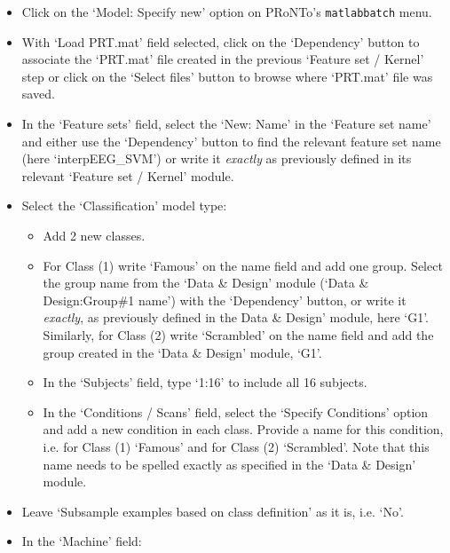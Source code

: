 \begin{itemize}

\item Click on the `Model: Specify new' option on PRoNTo's {\tt matlabbatch} menu.
	
	\item With `Load PRT.mat' field selected, click on the `Dependency' button to associate the `PRT.mat' file created in the previous `Feature set / Kernel' step or click on the `Select files' button to browse where `PRT.mat' file was saved.
	
	\item In the `Feature sets' field, select the `New: Name' in the `Feature set name' and either use the `Dependency' button to find the relevant feature set name (here `interpEEG\_SVM') or write it {\it exactly} as previously defined in its relevant `Feature set / Kernel' module.

	\item Select the `Classification' model type:
	
		\begin{itemize}
		
		\item Add 2 new classes.
		
		\item For Class (1) write `Famous' on the name field and add one group. Select the group name from the `Data \& Design' module (`Data \& Design:Group\#1 name') with the `Dependency' button, or write it {\it exactly}, as previously defined in the Data \& Design' module, here `G1'. Similarly, for Class (2) write `Scrambled' on the name field and add the group created in the `Data \& Design' module, `G1'.	
		
		\item In the `Subjects' field, type `1:16' to include all 16 subjects.
		
		\item In the `Conditions / Scans' field, select the `Specify Conditions' option and add a new condition in each class. Provide a name for this condition, i.e. for Class (1) `Famous' and for Class (2) `Scrambled'. Note that this name needs to be spelled exactly as specified in the `Data \& Design' module.
		
		\end{itemize}

        \item Leave `Subsample examples based on class definition' as it is, i.e. `No'.

	\item In the `Machine' field:
	

\end{itemize}
